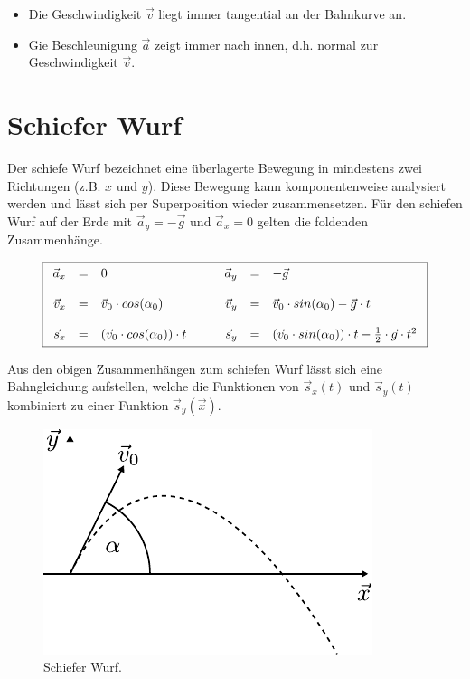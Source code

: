 \begin{itemize}
	\item Die Geschwindigkeit $\vec{v}$ liegt immer tangential an
		der Bahnkurve an.
	\item Gie Beschleunigung $\vec{a}$ zeigt immer nach innen, 
		d.h. normal zur Geschwindigkeit $\vec{v}$.
\end{itemize}

\section{Schiefer Wurf}
Der schiefe Wurf bezeichnet eine überlagerte Bewegung in mindestens zwei
Richtungen (z.B. $x$ und $y$). Diese Bewegung kann komponentenweise 
analysiert werden und lässt sich per Superposition wieder zusammensetzen.
Für den schiefen Wurf auf der Erde mit $\vec{a}_y=-\vec{g}$ und 
$\vec{a}_x=0$ gelten die foldenden Zusammenhänge.

\[\boxed{\begin{array}{r c l  r c l}
	\vec{a}_x 
		&=& 0 
		& \qquad \vec{a}_y 
		&=& -\vec{g} \\
	 & & &  \\
	\vec{v}_x 
		&=& \vec{v}_0 \cdot cos(\alpha_0)
		& \vec{v}_y
		&=& \vec{v}_0 \cdot sin(\alpha_0) -\vec{g} \cdot t \\
	 & & & \\
	\vec{s}_x
		&=& \left( \vec{v}_0 \cdot cos(\alpha_0) \right) \cdot t
		& \vec{s}_y
		&=& \left( \vec{v}_0 \cdot sin(\alpha_0) \right) \cdot t 
			- \frac{1}{2} \cdot \vec{g} \cdot t^2
\end{array}}\]

\noindent
Aus den obigen Zusammenhängen zum schiefen Wurf lässt sich eine 
Bahngleichung aufstellen, welche die Funktionen von $\vec{s}_x(t)$ und
$\vec{s}_y(t)$ kombiniert zu einer Funktion $\vec{s}_y(\vec{x})$.

\begin{figure}[h!]
	\centering
	\includegraphics[scale=0.8]{wurf.pdf}
	\caption{Schiefer Wurf.}
	\label{fig:wurf}
\end{figure}

